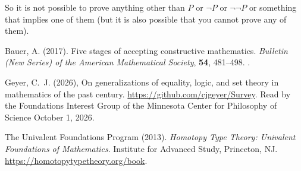 \documentclass[11pt]{article}
\begin{document}
So it is not possible to prove anything other than $P$ or $\neg P$
or $\neg\neg P$ or something that implies one of them (but it is also
possible that you cannot prove any of them).

\begin{thebibliography}{}

Bauer, A. (2017).
\newblock Five stages of accepting constructive mathematics.
\newblock \emph{Bulletin (New Series) of the American Mathematical Society},
    \textbf{54}, 481--498.
\newblock {}.

Geyer, C.~J. (2026),
\newblock On generalizations of equality, logic, and set theory in
    mathematics of the past century.
\newblock \url{https://github.com/cjgeyer/Survey}.
\newblock Read by the Foundations Interest Group of the Minnesota Center
    for Philosophy of Science October 1, 2026.

The Univalent Foundations Program (2013).
\newblock \emph{Homotopy Type Theory: Univalent Foundations of Mathematics}.
\newblock Institute for Advanced Study, Princeton, NJ.
\newblock \url{https://homotopytypetheory.org/book}.

\end{thebibliography}
\end{document}
